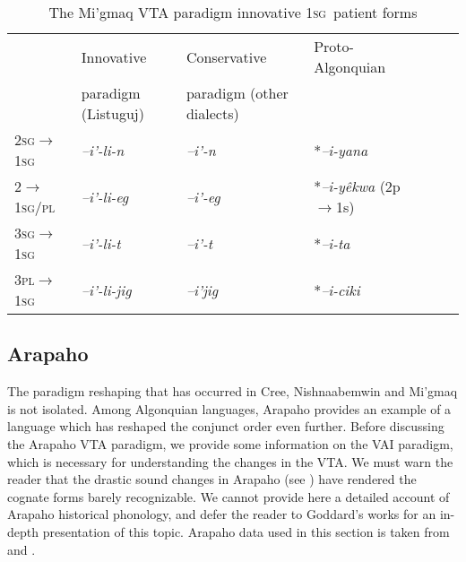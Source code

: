 \documentclass[twoside,a4paper,11pt]{article}
\newcommand{\ipa}[1]{{\phon\textit{#1}}}
\newcommand{\sg}{\textsc{sg}}
\newcommand{\pl}{\textsc{pl}}
\newcommand{\grise}[1]{\cellcolor{lightgray}\textbf{#1}}
\newcommand{\Σ}{\greek{Σ}}
\begin{document}
\begin{table}[H]
\caption{The Mi'gmaq VTA paradigm innovative 1\sg\ patient forms}
\centering \label{tab:migmaq.vta.innov.1s}
\begin{tabular}{lllllll}
\toprule
& Innovative & Conservative & Proto-Algonquian \\
&paradigm (Listuguj) & paradigm (other dialects) &\\
\midrule
2\sg$\rightarrow$1\sg &\ipa{--i'-li-n} \grise{}& 	\ipa{--i'-n} & *\ipa{--i-yana}\\
2$\rightarrow$1\sg/\pl &\ipa{--i'-li-eg} \grise{}& 	\ipa{--i'-eg} & *\ipa{--i-yêkwa} (2p$\rightarrow$1s)\\
\midrule
3\sg$\rightarrow$1\sg & 	\ipa{--i'-li-t} \grise{}& 	\ipa{--i'-t} &  *\ipa{--i-ta} \\
3\pl$\rightarrow$1\sg & 	\ipa{--i'-li-jig} \grise{}& 	\ipa{--i'jig}  &*\ipa{--i-ciki} \\
\bottomrule
\end{tabular}
\end{table}


\subsection{Arapaho}

The paradigm reshaping that has occurred in Cree, Nishnaabemwin and Mi'gmaq is not isolated. Among Algonquian languages, Arapaho provides an example of a language which has reshaped the conjunct order even further. Before discussing the Arapaho VTA paradigm, we provide some information on the VAI   paradigm, which is necessary for understanding the changes in the VTA. %
We must warn the reader that the drastic sound changes in Arapaho (see \citealt{goddard74arapaho}) have rendered the cognate forms barely recognizable. We cannot provide here a detailed account of Arapaho historical phonology, and defer the reader to Goddard's works for an in-depth presentation of this topic. Arapaho data used in this section is taken from \citet{salzmann67arapaho.verb} and \citet{cowell06arapaho}.
\end{document}
